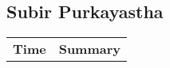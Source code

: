 \begin{appendix}
\begin{longtable}{l p{12.5cm}}
\end{longtable}

\tocless\subsection{Subir Purkayastha}

\begin{longtable}{l p{12.5cm}}
	\textbf{Time} & \textbf{Summary} \\ 
	
\end{longtable}	

\end{appendix}	